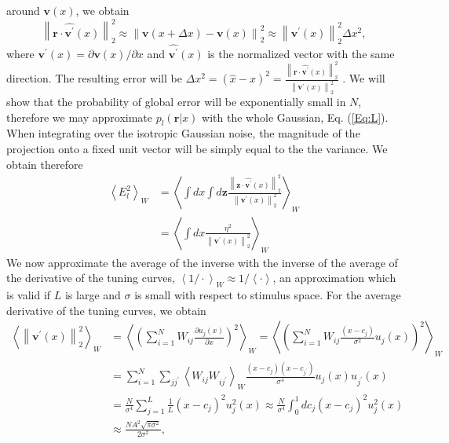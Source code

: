 \documentclass[a4paper]{article}%
\begin{document}
around $\mathbf{v}(x)$, we obtain
\begin{equation}
\left\|  \mathbf{r}\cdot\hat{\mathbf{v^{\prime}}}(x)\right\|  _{2}^{2}
\approx\left\|  \mathbf{v}(x+\Delta x)-\mathbf{v}(x)\right\|  _{2}^{2}
\approx\left\|  \mathbf{v^{\prime}}(x)\right\|  _{2}^{2}\Delta x^{2},
\label{Eq:lin-exp}%
\end{equation}
where $\mathbf{v^{\prime}}(x) = \partial\mathbf{v}(x)/\partial x$ and
$\hat{\mathbf{v^{\prime}}}(x)$ is the normalized vector with the same
direction. The resulting error will be $\Delta x^{2} = \left(  \hat
{x}-x\right)  ^{2} = \frac{\left\|  \mathbf{r}\cdot\hat{\mathbf{v^{\prime}}%
}(x)\right\|  _{2}^{2}}{\left\|  \mathbf{v^{\prime} }(x)\right\|  _{2}^{2}}$ .
We will show that the probability of global error will be exponentially small
in $N$, therefore we may approximate $p_{l} (\mathbf{r}|x)$ with the whole
Gaussian, Eq. (\ref{Eq:L}). When integrating over the isotropic Gaussian
noise, the magnitude of the projection onto a fixed unit vector will be simply
equal to the the variance. We obtain therefore
\begin{equation}%
\begin{split}
\left\langle E_{l}^{2}\right\rangle _{W}  &  = \left\langle \int dx \int
d\mathbf{z} \frac{ \left\|  \mathbf{z}\cdot\hat{\mathbf{v^{\prime}}%
}(x)\right\|  _{2}^{2} }{\left\|  \mathbf{v^{\prime}}(x)\right\|  _{2}^{2}%
}\right\rangle _{W}\\
&  =\left\langle \int dx \frac{\eta^{2} }{\left\|  \mathbf{v^{\prime}%
}(x)\right\|  _{2}^{2}}\right\rangle _{W}%
\end{split}
\end{equation}
We now approximate the average of the inverse with the inverse of the average
of the derivative of the tuning curves, $\left\langle 1 / \cdot\right\rangle
_{W} \approx1/ \left\langle \cdot\right\rangle $, an approximation which is
valid if $L$ is large and $\sigma$ is small with respect to stimulus space.
For the average derivative of the tuning curves, we obtain
\begin{equation}%
\begin{split}
\left\langle \left\|  \mathbf{v^{\prime}}(x)\right\|  _{2}^{2}\right\rangle
_{W}  &  = \left\langle \left(  \sum_{i=1}^{N} W_{ij} \frac{\partial u_{j}%
(x)}{\partial x}\right)  ^{2} \right\rangle _{W} = \left\langle \left(
\sum_{i=1}^{N} W_{ij} \frac{\left(  x-c_{j}\right)  }{\sigma^{2}}u_{j}(x)
\right)  ^{2}\right\rangle _{W}\\
&  = \sum_{i=1}^{N} \sum_{jj^{\prime}} \left\langle W_{ij}W_{ij^{\prime}%
}\right\rangle _{W} \frac{(x-c_{j})(x-c_{j^{\prime}} )}{\sigma^{4}} u_{j}(x)
u_{j^{\prime}}(x)\\
&  = \frac{N }{\sigma^{4}} \sum_{j=1}^{L}\frac{1}{L} \left(  x-c_{j}\right)
^{2} u_{j}^{2}(x) \approx\frac{N }{\sigma^{4}} \int_{0}^{1} dc_{j} \left(
x-c_{j}\right)  ^{2} u_{j}^{2}(x)\\
&  \approx\frac{NA^{2} \sqrt{\pi\sigma^{2}}}{2\sigma^{2}},
\end{split}
\label{Eq:tcd}%
\end{equation}
\end{document}

